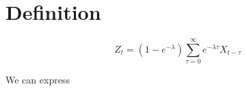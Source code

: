 \section{Definition}

$$
Z_t = (1-e^{-\lambda}) \sum_{\tau=0}^{\infty} e^{-\lambda \tau} X_{t-\tau}
$$

We can express